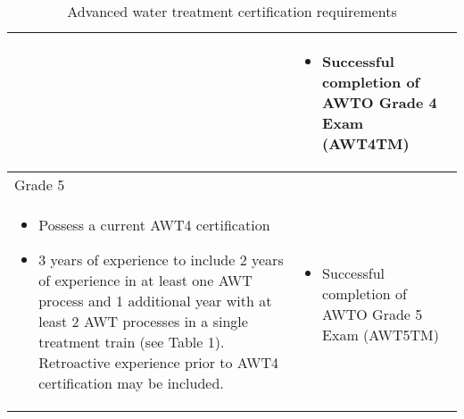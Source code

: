 \begin{table}[H]
\begin{tabularx}{\textwidth}{| X | X |}
\begin{itemize}
\end{itemize}
& 
\begin{itemize}
\item Successful   completion of AWTO Grade 4 Exam (AWT4TM) 
\end{itemize}\\
\hline
\multicolumn{2}{|l|}{Grade 5}                                                                                                                                                                                                                                                                                                                                                                                                  \\
\hline
\begin{itemize} 
\item Possess a   current AWT4 certification 
\item 3 years of   experience to include 2 years of experience in at least one AWT process and 1   additional year with at least 2 AWT processes in a single treatment train   (see Table 1). Retroactive experience prior to AWT4 certification may be   included. 
\end{itemize}
&\begin{itemize}
\item Successful completion of AWTO Grade 5 Exam (AWT5TM)
\end{itemize}\\
\hline
\end{tabularx}

\caption{Advanced water treatment certification requirements}
\end{table}
